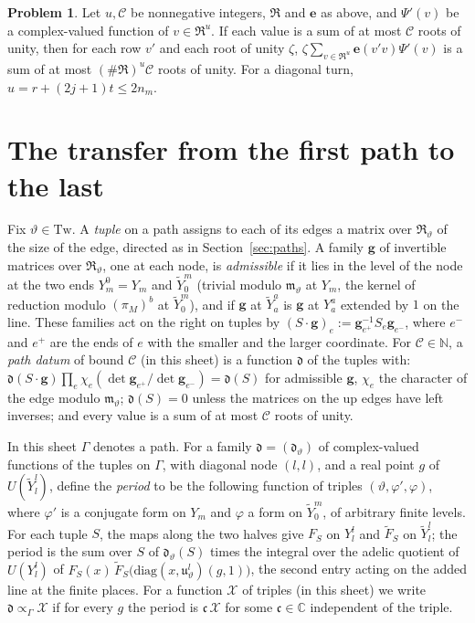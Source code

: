 \documentclass[reqno]{amsart}
\theoremstyle{definition}
\newtheorem{problem}{Problem}[section]
\theoremstyle{plain}
\newcommand{\C}{\mathbb C}
\newcommand{\Tw}{\mathrm{Tw}}
\newcommand{\Yt}{\widetilde Y}
\newcommand{\Rm}{\mathfrak R}
\newcommand{\dd}{\mathfrak d}
\begin{document}
\begin{problem}\label{pr:roots}
Let \(u, \mathcal C\) be nonnegative integers, \(\Rm\) and \(\mathbf e\) as above, and \(\Psi'(v)\) be a complex-valued function of \(v \in \Rm^u\).  If each value is a sum of at most \(\mathcal C\) roots of unity, then for each row \(v'\) and each root of unity \(\zeta\), \(\zeta\sum_{v \in \Rm^u}\mathbf e(v'v)\Psi'(v)\) is a sum of at most \((\#\Rm)^u\mathcal C\) roots of unity.  For a diagonal turn, \(u = r + (2j+1)t \le 2n_m\).
\end{problem}

\section{The transfer from the first path to the last}\label{sec:transfer}

Fix \(\vartheta \in \Tw\).  A \emph{tuple} on a path assigns to each of its edges a matrix over \(\Rm_\vartheta\) of the size of the edge, directed as in Section~\ref{sec:paths}.  A family \(\mathbf g\) of invertible matrices over \(\Rm_\vartheta\), one at each node, is \emph{admissible} if it lies in the level of the node at the two ends \(Y^0_m = Y_m\) and \(\Yt^m_0\) (trivial modulo \(\mathfrak m_\vartheta\) at \(Y_m\), the kernel of reduction modulo \((\pi_M)^b\) at \(\Yt^m_0\)), and if \(\mathbf g\) at \(\Yt^a_a\) is \(\mathbf g\) at \(Y^a_a\) extended by \(1\) on the line.  These families act on the right on tuples by \((S\cdot\mathbf g)_e := \mathbf g_{e^+}^{-1}S_e\mathbf g_{e^-}\), where \(e^-\) and \(e^+\) are the ends of \(e\) with the smaller and the larger coordinate.  For \(\mathcal C \in \mathbb N\), a \emph{path datum} of bound \(\mathcal C\) (in this sheet) is a function \(\dd\) of the tuples with: \(\dd(S\cdot\mathbf g)\prod_e \chi_e(\det \mathbf g_{e^+}/\det \mathbf g_{e^-}) = \dd(S)\) for admissible \(\mathbf g\), \(\chi_e\) the character of the edge modulo \(\mathfrak m_\vartheta\); \(\dd(S) = 0\) unless the matrices on the up edges have left inverses; and every value is a sum of at most \(\mathcal C\) roots of unity.

In this sheet \(\Gamma\) denotes a path.  For a family \(\dd = (\dd_\vartheta)\) of complex-valued functions of the tuples on \(\Gamma\), with diagonal node \((l, l)\), and a real point \(g\) of \(U(\Yt^l_l)\), define the \emph{period} to be the following function of triples \((\vartheta, \varphi', \varphi)\), where \(\varphi'\) is a conjugate form on \(Y_m\) and \(\varphi\) a form on \(\Yt^m_0\), of arbitrary finite levels.  For each tuple \(S\), the maps along the two halves give \(F_S\) on \(Y^l_l\) and \(\widetilde F_S\) on \(\Yt^l_l\); the period is the sum over \(S\) of \(\dd_\vartheta(S)\) times the integral over the adelic quotient of \(U(Y^l_l)\) of \(F_S(x)\,\widetilde F_S\bigl(\mathrm{diag}(x, \mathfrak u_\vartheta^l)(g, 1)\bigr)\), the second entry acting on the added line at the finite places.  For a function \(\mathcal X\) of triples (in this sheet) we write \(\dd \propto_\Gamma \mathcal X\) if for every \(g\) the period is \(\mathfrak c\,\mathcal X\) for some \(\mathfrak c \in \C\) independent of the triple.
\end{document}
